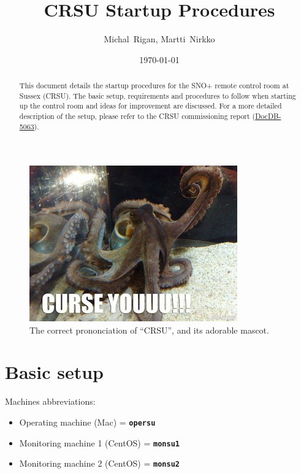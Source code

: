 \documentclass[12pt, a4paper]{article}
\title{CRSU Startup Procedures}
\author{Michal~Rigan, Martti~Nirkko}
\affil{University of Sussex}
\date{\today}
\begin{document}
\maketitle
\begin{abstract}
	This document details the startup procedures for the SNO+ remote control room at Sussex (CRSU). The basic setup, requirements and procedures to follow when starting up the control room and ideas for improvement are discussed. For a more detailed description of the setup, please refer to the CRSU commissioning report (\href{https://www.snolab.ca/snoplus/private/DocDB/cgi/ShowDocument?docid=5063}{DocDB-5063}).
\end{abstract}
\vspace{2cm}

\begin{figure}[htp]
	\centering
	\includegraphics[width=0.8\textwidth]{../Miscellaneous/crsu_mascot}
	\caption{The correct prononciation of ``CRSU'', and its adorable mascot.}
	\label{crsu_mascot}
\end{figure}
\clearpage


\section{Basic setup}
Machines abbreviations:
\begin{itemize}
	\item Operating machine (Mac) = \textbf{\tt opersu}
	\item Monitoring machine 1 (CentOS) = \textbf{\tt monsu1}
	\item Monitoring machine 2 (CentOS) = \textbf{\tt monsu2}
\end{itemize}
\end{document}
